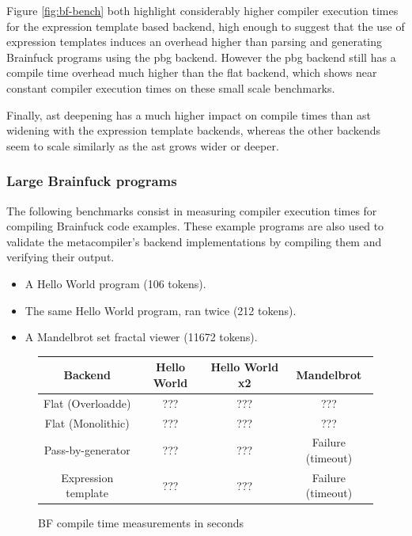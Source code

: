 \documentclass[../main]{subfiles}
\begin{document}
Figure \ref{fig:bf-bench}
both highlight considerably higher compiler execution times for the expression
template based backend, high enough to suggest that the use of expression
templates induces an overhead higher than parsing and generating Brainfuck
programs using the \gls{pbg} backend. However the \gls{pbg}
backend still has a compile time overhead much higher than the flat backend,
which shows near constant compiler execution times on these small scale
benchmarks.

Finally, \gls{ast} deepening has a much higher impact on compile times than \gls{ast}
widening with the expression template backends, whereas the other backends seem
to scale similarly as the \gls{ast} grows wider or deeper.

\subsubsection{
  Large Brainfuck programs
}

The following benchmarks consist in measuring compiler execution times for
compiling Brainfuck code examples. These example programs are also used to
validate the metacompiler's backend implementations by compiling them and
verifying their output.

\begin{itemize}
\item A Hello World program (106 tokens).
\item The same Hello World program, ran twice (212 tokens).
\item A Mandelbrot set fractal viewer (11672 tokens).
\end{itemize}


\begin{figure}
\begin{tabular}{|c|c|c|c|}
\hline
Backend             & Hello World & Hello World x2  & Mandelbrot \\
\hline
Flat (Overloadde)   & ???         & ???             & ??? \\
Flat (Monolithic)   & ???         & ???             & ??? \\
Pass-by-generator   & ???         & ???             & Failure (timeout) \\
Expression template & ???         & ???             & Failure (timeout) \\
\hline
\end{tabular}
\caption{BF compile time measurements in seconds
}\label{fig:BF-compile-times}
\end{figure}
\end{document}
